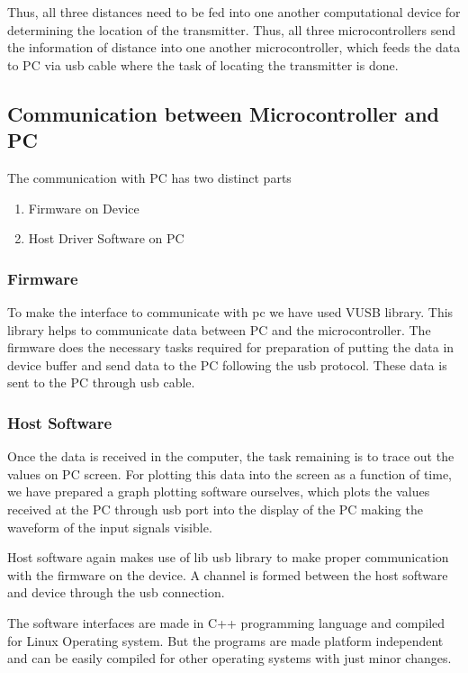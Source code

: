 Thus, all three distances need to be fed into one another computational device for determining the location of the transmitter. Thus, all three microcontrollers send the information of distance into one another microcontroller, which feeds the data to PC via \gls{usb} cable where the task of locating the transmitter is done.

\subsection{Communication between Microcontroller and PC}
The communication with PC has two distinct parts
\begin{enumerate}
	\item Firmware on Device
	\item Host Driver Software on PC
\end{enumerate}
\subsubsection{Firmware}
To make the interface to communicate with pc we have used VUSB library. This library helps to communicate data between PC and the microcontroller. The firmware does the necessary tasks required for preparation of putting the data in device buffer and send data to the PC following the \gls{usb} protocol. These data is sent to the PC through \gls{usb} cable.


\subsubsection{Host Software}
Once the data is received in the computer, the task remaining is to trace out the values on PC screen. For plotting this data into the screen as a function of time, we have prepared a graph plotting software ourselves, which plots the values received at the PC through \gls{usb} port into the display of the PC making the waveform of the input signals visible. 

Host software again makes use of lib \gls{usb} library to make proper communication with the firmware on the device. A channel is formed between the host software and device through the \gls{usb} connection.


The software interfaces are made in C++ programming language and compiled for Linux Operating system. But the programs are made platform independent and can be easily compiled for other operating systems with just minor changes.